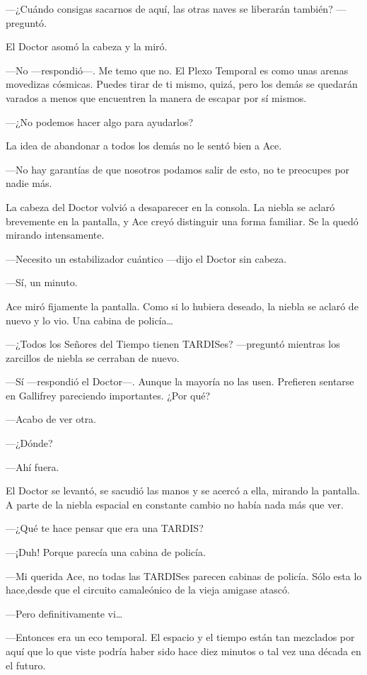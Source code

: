 ---¿Cuándo consigas sacarnos de aquí, las otras naves se
liberarán también? ---preguntó.

El Doctor asomó la cabeza y la miró.

---No ---respondió---. Me temo que no. El Plexo Temporal es como
unas arenas movedizas cósmicas. Puedes tirar de ti mismo, quizá, pero
los demás se quedarán varados a menos que encuentren la manera de
escapar por sí mismos.

---¿No podemos hacer algo para ayudarlos?

La idea de abandonar a todos los demás no le sentó bien a Ace.

---No hay garantías de que nosotros podamos salir de esto, no te
preocupes por nadie más.

La cabeza del Doctor volvió a desaparecer en la consola. La
niebla se aclaró brevemente en la pantalla, y Ace creyó distinguir una
forma familiar. Se la quedó mirando intensamente.

---Necesito un estabilizador cuántico ---dijo el Doctor sin
cabeza.

---Sí, un minuto.

Ace miró fijamente la pantalla. Como si lo hubiera deseado, la
niebla se aclaró de nuevo y lo vio. Una cabina de policía\ldots{}

---¿Todos los Señores del Tiempo tienen TARDISes? ---preguntó
mientras los zarcillos de niebla se cerraban de nuevo.

---Sí ---respondió el Doctor---. Aunque la mayoría no las usen.
Prefieren sentarse en Gallifrey pareciendo importantes. ¿Por qué?

---Acabo de ver otra.

---¿Dónde?

---Ahí fuera.

El Doctor se levantó, se sacudió las manos y se acercó a ella,
mirando la pantalla. A parte de la niebla espacial en constante cambio
no había nada más que ver.

---¿Qué te hace pensar que era una TARDIS?

---¡Duh! Porque parecía una cabina de policía.

---Mi querida Ace, no todas las TARDISes parecen cabinas de
policía. Sólo esta lo hace,desde que el circuito camaleónico de la
vieja amigase atascó.

---Pero definitivamente vi\ldots{}

---Entonces era un eco temporal. El espacio y el tiempo están
tan mezclados por aquí que lo que viste podría haber sido hace diez
minutos o tal vez una década en el futuro.

